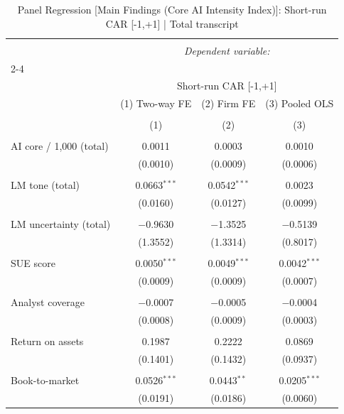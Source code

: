 
\begin{table}[!htbp] \centering 
  \caption{Panel Regression [Main Findings (Core AI Intensity Index)]: Short-run CAR [-1,+1]  |  Total transcript} 
  \label{} 
\begin{tabular}{@{\extracolsep{5pt}}lccc} 
\\[-1.8ex]\hline 
\hline \\[-1.8ex] 
 & \multicolumn{3}{c}{\textit{Dependent variable:}} \\ 
\cline{2-4} 
\\[-1.8ex] & \multicolumn{3}{c}{Short-run CAR [-1,+1]} \\ 
 & (1) Two-way FE & (2) Firm FE & (3) Pooled OLS \\ 
\\[-1.8ex] & (1) & (2) & (3)\\ 
\hline \\[-1.8ex] 
 AI core / 1,000 (total) & 0.0011 & 0.0003 & 0.0010 \\ 
  & (0.0010) & (0.0009) & (0.0006) \\ 
  & & & \\ 
 LM tone (total) & 0.0663$^{***}$ & 0.0542$^{***}$ & 0.0023 \\ 
  & (0.0160) & (0.0127) & (0.0099) \\ 
  & & & \\ 
 LM uncertainty (total) & $-$0.9630 & $-$1.3525 & $-$0.5139 \\ 
  & (1.3552) & (1.3314) & (0.8017) \\ 
  & & & \\ 
 SUE score & 0.0050$^{***}$ & 0.0049$^{***}$ & 0.0042$^{***}$ \\ 
  & (0.0009) & (0.0009) & (0.0007) \\ 
  & & & \\ 
 Analyst coverage & $-$0.0007 & $-$0.0005 & $-$0.0004 \\ 
  & (0.0008) & (0.0009) & (0.0003) \\ 
  & & & \\ 
 Return on assets & 0.1987 & 0.2222 & 0.0869 \\ 
  & (0.1401) & (0.1432) & (0.0937) \\ 
  & & & \\ 
 Book-to-market & 0.0526$^{***}$ & 0.0443$^{**}$ & 0.0205$^{***}$ \\ 
  & (0.0191) & (0.0186) & (0.0060) \\ 

\end{tabular}
\end{table}

